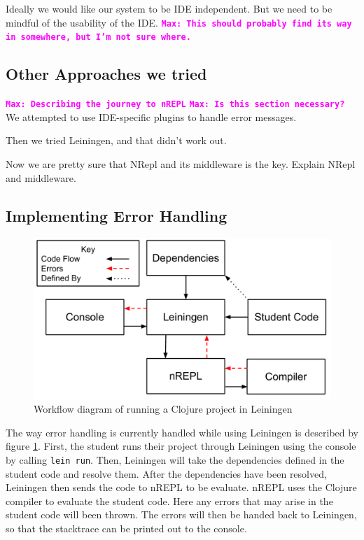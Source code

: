 \documentclass[12pt]{article}
\newcommand{\comment}[1]{{\bf \tt  {#1}}}
\newcommand{\mmcomment}[1]{\textcolor{magenta}{\comment{Max: {#1}}}}
\begin{document}
Ideally we would like our system to be IDE independent. But we need to be mindful of the usability of the IDE. \mmcomment{This should probably find its way in somewhere, but I'm not sure where.}

\subsection{Other Approaches we tried}
\mmcomment{Describing the journey to nREPL}
\mmcomment{Is this section necessary?}
We attempted to use IDE-specific plugins to handle error messages.

Then we tried Leiningen, and that didn't work out.

Now we are pretty sure that NRepl and its middleware is the key. Explain NRepl and middleware.
\subsection{Implementing Error Handling}

\begin{figure}[h]
 \includegraphics[width=12cm]{CurrentErrorHandling.pdf}
 \centering
 \caption{Workflow diagram of running a Clojure project in Leiningen}
 \label{fig:CurrentError}
\end{figure}

The way error handling is currently handled while using Leiningen is described by figure \ref{fig:CurrentError}. First, the student runs their project through Leiningen using the console by calling \texttt{lein run}. Then, Leiningen will take the dependencies defined in the student code and resolve them. After the dependencies have been resolved, Leiningen then sends the code to nREPL to be evaluate. nREPL uses the Clojure compiler to evaluate the student code. Here any errors that may arise in the student code will been thrown. The errors will then be handed back to Leiningen, so that the stacktrace can be printed out to the console.
\end{document}
